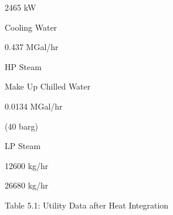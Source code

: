 \documentclass[a4paper,portrait,12pt]{article}
\begin{document}
\begin{flushleft}
2465 kW
\end{flushleft}





\begin{flushleft}
Cooling Water
\end{flushleft}





\begin{flushleft}
0.437 MGal/hr
\end{flushleft}





\begin{flushleft}
HP Steam
\end{flushleft}





\begin{flushleft}
Make Up Chilled Water
\end{flushleft}





\begin{flushleft}
0.0134 MGal/hr
\end{flushleft}





\begin{flushleft}
(40 barg)
\end{flushleft}





\begin{flushleft}
LP Steam
\end{flushleft}





\begin{flushleft}
12600 kg/hr
\end{flushleft}





\begin{flushleft}
26680 kg/hr
\end{flushleft}





\begin{flushleft}
Table 5.1: Utility Data after Heat Integration
\end{flushleft}
\end{document}
